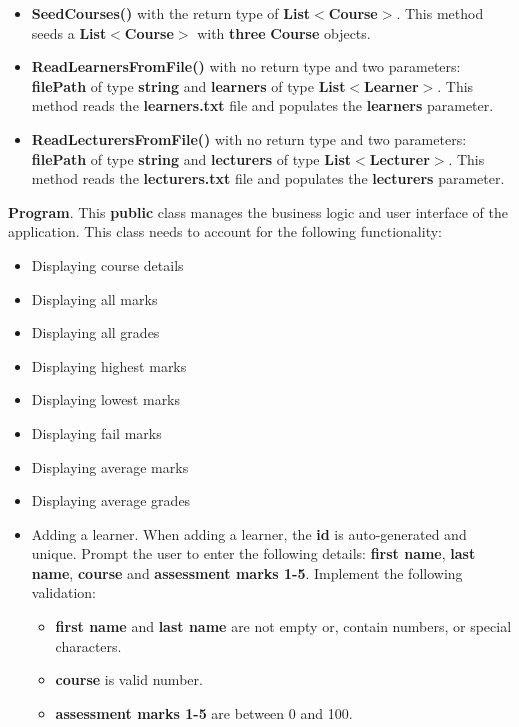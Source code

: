 \documentclass{article}
\begin{document}
\begin{itemize}
\begin{itemize}
\begin{itemize}
            \item \textbf{SeedCourses()} with the return type of \textbf{List$<$Course$>$}. This method seeds a \textbf{List$<$Course$>$} with \textbf{three} \textbf{Course} objects. 
            \item \textbf{ReadLearnersFromFile()} with no return type and two parameters: \textbf{filePath} of type \textbf{string} and \textbf{learners} of type \textbf{List$<$Learner$>$}. This method reads the \textbf{learners.txt} file and populates the \textbf{learners} parameter.
            \item \textbf{ReadLecturersFromFile()} with no return type and two parameters: \textbf{filePath} of type \textbf{string} and \textbf{lecturers} of type \textbf{List$<$Lecturer$>$}. This method reads the \textbf{lecturers.txt} file and populates the \textbf{lecturers} parameter.
        \end{itemize}
        \textbf{Program}. This \textbf{public} class manages the business logic and user interface of the application. This class needs to account for the following functionality:
        \begin{itemize}
            \item Displaying course details
            \item Displaying all marks
            \item Displaying all grades
            \item Displaying highest marks
            \item Displaying lowest marks
            \item Displaying fail marks
            \item Displaying average marks
            \item Displaying average grades
            \item Adding a learner. When adding a learner, the \textbf{id} is auto-generated and unique. Prompt the user to enter the following details: \textbf{first name}, \textbf{last name}, \textbf{course} and \textbf{assessment marks 1-5}. Implement the following validation:
            \begin{itemize}
                \item \textbf{first name} and \textbf{last name} are not empty or, contain numbers, or special characters.
                \item \textbf{course} is valid number.
                \item \textbf{assessment marks 1-5} are between 0 and 100.

\end{itemize}
\end{itemize}
\end{itemize}
\end{itemize}
\end{document}
